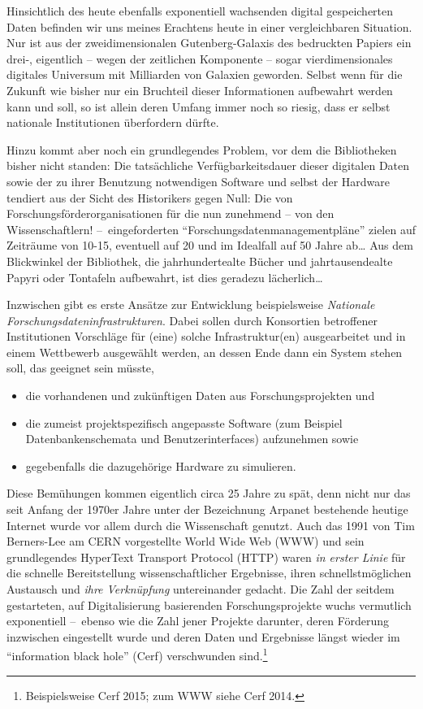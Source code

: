 \documentclass[a4paper,
fontsize=11pt,
oneside,
numbers=noperiodatend,
parskip=half-,
bibliography=totoc,
final
]{scrartcl}
\begin{document}
Hinsichtlich des heute ebenfalls exponentiell wachsenden digital
gespeicherten Daten befinden wir uns meines Erachtens heute in einer
vergleichbaren Situation. Nur ist aus der zweidimensionalen
Gutenberg-Galaxis des bedruckten Papiers ein drei-, eigentlich -- wegen
der zeitlichen Komponente -- sogar vierdimensionales digitales Universum
mit Milliarden von Galaxien geworden. Selbst wenn für die Zukunft wie
bisher nur ein Bruchteil dieser Informationen aufbewahrt werden kann und
soll, so ist allein deren Umfang immer noch so riesig, dass er selbst
nationale Institutionen überfordern dürfte.

Hinzu kommt aber noch ein grundlegendes Problem, vor dem die
Bibliotheken bisher nicht standen: Die tatsächliche Verfügbarkeitsdauer
dieser digitalen Daten sowie der zu ihrer Benutzung notwendigen Software
und selbst der Hardware tendiert aus der Sicht des Historikers gegen
Null: Die von Forschungsförderorganisationen für die nun zunehmend --
von den Wissenschaftlern! --~eingeforderten
\enquote{Forschungsdatenmanagementpläne} zielen auf Zeiträume von 10-15,
eventuell auf 20 und im Idealfall auf 50 Jahre ab\ldots{} Aus dem
Blickwinkel der Bibliothek, die jahrhundertealte Bücher und
jahrtausendealte Papyri oder Tontafeln aufbewahrt, ist dies geradezu
lächerlich\ldots{}

Inzwischen gibt es erste Ansätze zur Entwicklung beispielsweise
\emph{Nationale Forschungsdateninfrastrukturen}. Dabei sollen durch
Konsortien betroffener Institutionen Vorschläge für (eine) solche
Infrastruktur(en) ausgearbeitet und in einem Wettbewerb ausgewählt
werden, an dessen Ende dann ein System stehen soll, das geeignet sein
müsste,

\begin{itemize}
\item
  die vorhandenen und zukünftigen Daten aus Forschungsprojekten und
\item
  die zumeist projektspezifisch angepasste Software (zum Beispiel
  Datenbankenschemata und Benutzerinterfaces) aufzunehmen sowie
\item
  gegebenfalls die dazugehörige Hardware zu simulieren.
\end{itemize}

Diese Bemühungen kommen eigentlich circa 25 Jahre zu spät, denn nicht
nur das seit Anfang der 1970er Jahre unter der Bezeichnung Arpanet
bestehende heutige Internet wurde vor allem durch die Wissenschaft
genutzt. Auch das 1991 von Tim Berners-Lee am CERN vorgestellte World
Wide Web (WWW) und sein grundlegendes HyperText Transport Protocol
(HTTP) waren \emph{in erster Linie} für die schnelle Bereitstellung
wissenschaftlicher Ergebnisse, ihren schnellstmöglichen Austausch und
\emph{ihre Verknüpfung} untereinander gedacht. Die Zahl der seitdem
gestarteten, auf Digitalisierung basierenden Forschungsprojekte wuchs
vermutlich exponentiell --~ebenso wie die Zahl jener Projekte darunter,
deren Förderung inzwischen eingestellt wurde und deren Daten und
Ergebnisse längst wieder im \enquote{information black hole} (Cerf)
verschwunden sind.\footnote{Beispielsweise Cerf 2015; zum WWW siehe Cerf
  2014.}
\end{document}
